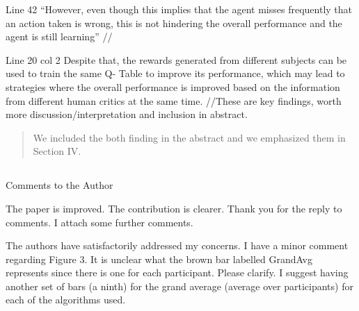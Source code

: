 \documentclass[journal,onecolumn,12pt]{IEEEtran}
\begin{document}
Line 42 “However, even though this implies that the agent misses frequently that an action taken is wrong, this is not hindering the overall performance and the agent is still learning” //

Line 20 col 2 Despite that, the rewards generated from different subjects can be used to train the same Q- Table to improve its performance, which may lead to strategies where the overall performance is improved based on the information from different human critics at the same time.
//These are key findings, worth more discussion/interpretation and inclusion in abstract.

\begin{quotation}
{\color{blue}
We included the both finding in the abstract and we emphasized them  in Section IV. 
}
\end{quotation}


\subsection*{}

Comments to the Author

The paper is improved. The contribution is clearer. Thank you for the reply to comments. I attach some further comments.

The authors have satisfactorily addressed my concerns. I have a minor comment regarding Figure 3. It is unclear what the brown bar labelled GrandAvg represents since there is one for each participant. Please clarify. I suggest having another set of bars (a ninth) for the grand average (average over participants) for each of the algorithms used.
\end{document}
